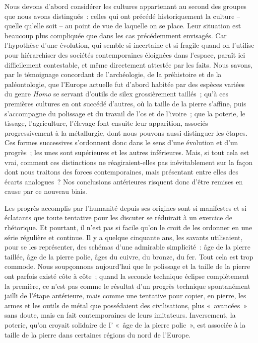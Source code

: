 \documentclass[french,twoside]{book} %
\begin{document}
\noindent Nous devons d’abord considérer les cultures appartenant au second des groupes que nous avons distingués : celles qui ont précédé historiquement la culture – quelle qu’elle soit – au point de vue de laquelle on se place. Leur situation est beaucoup plus compliquée que dans les cas précédemment envisagés. Car l’hypothèse d’une évolution, qui semble si incertaine et si fragile quand on l’utilise pour hiérarchiser des sociétés contemporaines éloignées dans l’espace, paraît ici difficilement contestable, et même directement attestée par les faits. Nous savons, par le témoignage concordant de l’archéologie, de la préhistoire et de la paléontologie, que l’Europe actuelle fut d’abord habitée par des espèces variées du genre \emph{Homo} se servant d’outils de silex grossièrement taillés ; qu’à ces premières cultures en ont succédé d’autres, où la taille de la pierre s’affine, puis s’accompagne du polissage et du travail de l’os et de l’ivoire ; que la poterie, le tissage, l’agriculture, l’élevage font ensuite leur apparition, associés progressivement à la métallurgie, dont nous pouvons aussi distinguer les étapes. Ces formes successives s’ordonnent donc dans le sens d’une évolution et d’un progrès ; les unes sont supérieures et les autres inférieures. Mais, si tout cela est vrai, comment ces distinctions ne réagiraient-elles pas inévitablement sur la façon dont nous traitons des forces contemporaines, mais présentant entre elles des écarts analogues ? Nos conclusions antérieures risquent donc d’être remises en cause par ce nouveau biais.\par
Les progrès accomplis par l’humanité depuis ses origines sont si manifestes et si éclatants que toute tentative pour les discuter se réduirait à un exercice de rhétorique. Et pourtant, il n’est pas si facile qu’on le croit de les ordonner en une série régulière et continue. Il y a quelque cinquante ans, les savants utilisaient, pour se les représenter, des schémas d’une admirable simplicité : âge de la pierre taillée, âge de la pierre polie, âges du cuivre, du bronze, du fer. Tout cela est trop commode. Nous soupçonnons aujourd’hui que le polissage et la taille de la pierre ont parfois existé côte à côte ; quand la seconde technique éclipse complètement la première, ce n’est pas comme le résultat d’un progrès technique spontanément jailli de l’étape antérieure, mais comme une tentative pour copier, en pierre, les armes et les outils de métal que possédaient des civilisations, plus « avancées » sans doute, mais en fait contemporaines de leurs imitateurs. Inversement, la poterie, qu’on croyait solidaire de I’ « âge de la pierre polie », est associée à la taille de la pierre dans certaines régions du nord de l’Europe.\par
\end{document}
